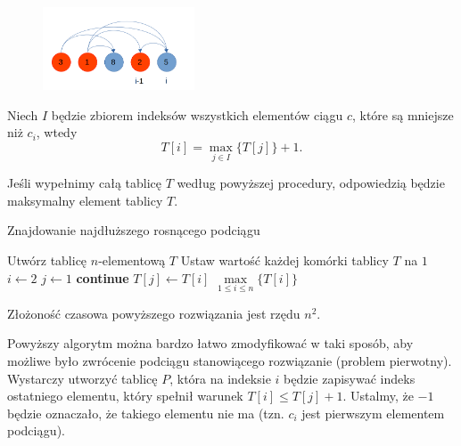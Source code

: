 \begin{figure}[H]
	\centering
	\includegraphics[width=0.4\textwidth]{data/prblm1_ex_graph2.png}
	\caption{  }
	\label{fig:example112_max_length}
\end{figure}

Niech $I$ będzie zbiorem indeksów wszystkich elementów ciągu $c$, które są 
mniejsze niż $c_i$, wtedy 
\[T[i]=\max\limits_{j \in I}\{T[j]\} + 1.\]

Jeśli wypełnimy całą tablicę $T$ według powyższej procedury, odpowiedzią
będzie maksymalny element tablicy $T$.

\begin{algorithm}[H]
	\caption{Znajdowanie najdłuższego rosnącego podciągu}\label{MaxIncreasingSubseqenceLength}
	\begin{algorithmic}[1]
		\State Utwórz tablicę $n$-elementową $T$
		\State Ustaw wartość każdej komórki tablicy $T$ na $1$
		\State $i \gets 2$
		\State $j \gets 1$
		\State \textbf{continue}
		\EndIf
		\State $T[j] \gets T[i]$
		\EndIf
		\EndWhile
		\EndWhile
		\State \Return $\max\limits_{1 \leq i \leq n}\{T[i]\}$
		\EndProcedure
	\end{algorithmic}
\end{algorithm}

Złożoność czasowa powyższego rozwiązania jest rzędu $n^2$. 

Powyższy algorytm można bardzo łatwo zmodyfikować w taki sposób, aby
możliwe było zwrócenie podciągu stanowiącego rozwiązanie (problem pierwotny).
Wystarczy utworzyć tablicę $P$, która na indeksie $i$
będzie zapisywać indeks ostatniego elementu, który spełnił 
warunek $T[i] \leq T[j] + 1$. Ustalmy, że $-1$ będzie oznaczało, że 
takiego elementu nie ma (tzn. $c_i$ jest pierwszym elementem podciągu).

